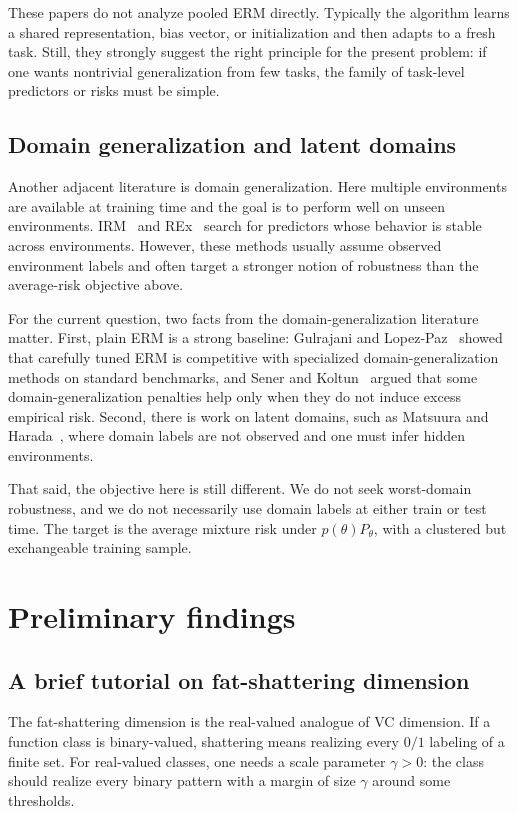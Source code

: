 \documentclass[11pt]{article}
\theoremstyle{definition}
\begin{document}
These papers do not analyze pooled ERM directly. Typically the algorithm learns a shared representation, bias vector, or initialization and then adapts to a fresh task. Still, they strongly suggest the right principle for the present problem: if one wants nontrivial generalization from few tasks, the family of task-level predictors or risks must be simple.

\subsection{Domain generalization and latent domains}
Another adjacent literature is domain generalization. Here multiple environments are available at training time and the goal is to perform well on unseen environments. IRM~\cite{arjovsky2019} and REx~\cite{krueger2021} search for predictors whose behavior is stable across environments. However, these methods usually assume observed environment labels and often target a stronger notion of robustness than the average-risk objective above.

For the current question, two facts from the domain-generalization literature matter. First, plain ERM is a strong baseline: Gulrajani and Lopez-Paz~\cite{gulrajani2020} showed that carefully tuned ERM is competitive with specialized domain-generalization methods on standard benchmarks, and Sener and Koltun~\cite{sener2023} argued that some domain-generalization penalties help only when they do not induce excess empirical risk. Second, there is work on latent domains, such as Matsuura and Harada~\cite{matsuura2019}, where domain labels are not observed and one must infer hidden environments.

That said, the objective here is still different. We do not seek worst-domain robustness, and we do not necessarily use domain labels at either train or test time. The target is the average mixture risk under $p(\theta)P_{\theta}$, with a clustered but exchangeable training sample.

\section{Preliminary findings}

\subsection{A brief tutorial on fat-shattering dimension}
The fat-shattering dimension is the real-valued analogue of VC dimension. If a function class is binary-valued, shattering means realizing every $0/1$ labeling of a finite set. For real-valued classes, one needs a scale parameter $\gamma > 0$: the class should realize every binary pattern with a margin of size $\gamma$ around some thresholds.
\end{document}
